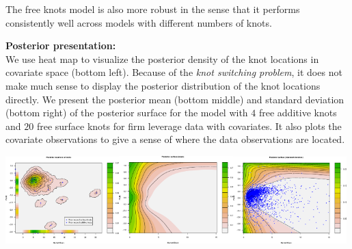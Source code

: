 \documentclass[a0paper,portrait,fontscale = 0.32,margin=1.5em]{baposter/baposter}
\begin{document}
\begin{poster}
{\begin{multicols}{3}
{\smaller {\color{red} $\bullet$}
The free knots model is also more robust in the sense that it performs
consistently well across models with different numbers of knots.
}
\end{multicols}

\begin{multicols}{3}

  {\color{red} \textbf{Posterior presentation:\\}}
We use heat map to visualize
  the posterior density of the knot locations in covariate space (bottom
  left). Because of the \emph{knot switching problem}, it does not make much
  sense to display the posterior distribution of the knot locations
  directly. We present the posterior mean (bottom middle) and standard
  deviation (bottom right) of the posterior surface for the model with $4$ free
  additive knots and $20$ free surface knots for firm leverage data with
  covariates. It also plots the covariate observations to give a sense of where
  the data observations are located.

\end{multicols}

\begin{center}  \includegraphics[width=0.33\textwidth]{RajanPostKnots.eps}\hspace{0.2em}\includegraphics[width=0.33\textwidth]{RajanPostMean.eps}\hspace{0.2em}\includegraphics[width=0.33\textwidth]{RajanPostSD.eps}
  \end{center}

}



\end{poster}
\end{document}
